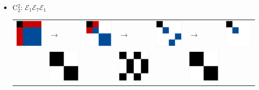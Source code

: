 \documentclass[11pt,dvipsnames]{article} %
\newcommand{\E}{\mathcal{E}}
\newcommand{\1}{\mathds{1}}
\begin{document}
\begin{itemize}
\begin{itemize}
\item C$_2^2$: $\E_1\E_7\E_1$\newline
\begin{tabular}{m{2cm} m{2cm} m{2cm} m{2cm} m{2cm} m{2cm} m{2cm}}
\includegraphics[width=2.2cm]{img-JA/id}  
& \hspace{0.8cm}$\longrightarrow$ 
& \includegraphics[width=2.2cm]{img-JA/8comp} 
& \hspace{0.8cm}$\longrightarrow$ 
& \includegraphics[width=2.2cm]{img-JA/4comp}
& \hspace{0.8cm}$\longrightarrow$ 
& \includegraphics[width=2.2cm]{C22}\\ 
 & \includegraphics[width=2.2cm]{img-JA/16To8} &  
 & \includegraphics[width=2.2cm]{img-JA/8To4} &
 & \includegraphics[width=2.2cm]{16To8}\\ 
\end{tabular}
\end{itemize}



\end{itemize}
\end{document}
